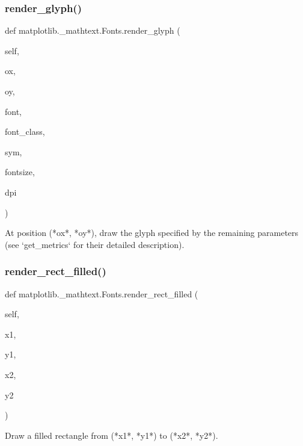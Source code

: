 \subsubsection{\texorpdfstring{render\+\_\+glyph()}{render\_glyph()}}
{\footnotesize\ttfamily def matplotlib.\+\_\+mathtext.\+Fonts.\+render\+\_\+glyph (\begin{DoxyParamCaption}\item[{}]{self,  }\item[{}]{ox,  }\item[{}]{oy,  }\item[{}]{font,  }\item[{}]{font\+\_\+class,  }\item[{}]{sym,  }\item[{}]{fontsize,  }\item[{}]{dpi }\end{DoxyParamCaption})}

\begin{DoxyVerb}At position (*ox*, *oy*), draw the glyph specified by the remaining
parameters (see `get_metrics` for their detailed description).
\end{DoxyVerb}
 \mbox{\label{classmatplotlib_1_1__mathtext_1_1Fonts_a4bf8a7061e25d14ffb02b860df99a558}} 
\subsubsection{\texorpdfstring{render\+\_\+rect\+\_\+filled()}{render\_rect\_filled()}}
{\footnotesize\ttfamily def matplotlib.\+\_\+mathtext.\+Fonts.\+render\+\_\+rect\+\_\+filled (\begin{DoxyParamCaption}\item[{}]{self,  }\item[{}]{x1,  }\item[{}]{y1,  }\item[{}]{x2,  }\item[{}]{y2 }\end{DoxyParamCaption})}

\begin{DoxyVerb}Draw a filled rectangle from (*x1*, *y1*) to (*x2*, *y2*).
\end{DoxyVerb}
 \mbox{\label{classmatplotlib_1_1__mathtext_1_1Fonts_a48ab0f528547f4c009357a4948cfc9c2}} 
